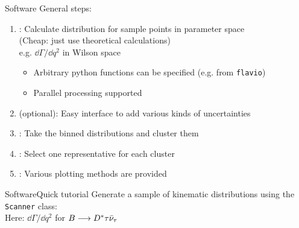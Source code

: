 \begin{frame}{Software}
    General steps:
    \begin{enumerate}
        \item {}: Calculate distribution for sample points in parameter space\\ (Cheap: just use theoretical calculations)\\
        {\footnotesize e.g. $\dd\Gamma/\dd q^2$ in Wilson space}
        \begin{itemize}
            \item Arbitrary python functions can be specified (e.g. from \texttt{flavio})
            \item Parallel processing supported
        \end{itemize}
        \item {} (optional): Easy interface to add various kinds of uncertainties\\
        \item {}: Take the binned distributions and cluster them\\
        \item {}: Select one representative for each cluster
        \item {}: Various plotting methods are provided
    \end{enumerate}
\end{frame}

\begin{frame}[t, fragile]{Software}{Quick tutorial}
    Generate a sample of kinematic distributions using the \texttt{Scanner} class:\\
    {\footnotesize Here: $\dd\Gamma/\dd q^2$ for $B\longrightarrow D^*\tau\bar\nu_\tau$}
    

\end{frame}

